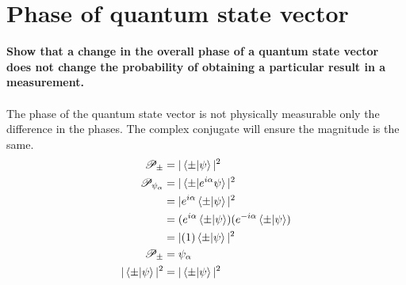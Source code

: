 \documentclass[paper=a4, fontsize=11pt]{scrartcl} %
\numberwithin{equation}{section} %
\numberwithin{figure}{section} %
\numberwithin{table}{section} %
\begin{document}
 \section{Phase of quantum state vector}
\textbf{Show that a change in the overall phase of a quantum state vector does not change the probability of obtaining a particular result in a measurement. }\\
\\
The phase of the quantum state vector is not physically measurable only the difference in the phases. The complex conjugate will ensure the magnitude is the same.
\begin{align*}
\mathscr{P_\pm} & = |\braket{\pm|\psi}|^2 \\
\mathscr{P_{\psi_\alpha}}& = |\braket{\pm | e^{i\alpha}\psi}|^2 \\
& = |e^{i\alpha} \braket{\pm | \psi}|^2 \\
& = (e^{i\alpha} \braket{\pm | \psi})(e^{-i\alpha} \braket{\pm | \psi}) \\
& = |(1)\braket{\pm | \psi}|^2 \\
\mathscr{P_\pm} & = \mathscr{\psi_\alpha} \\
|\braket{\pm | \psi}|^2 & = |\braket{\pm | \psi}|^2
\end{align*}
\end{document}
